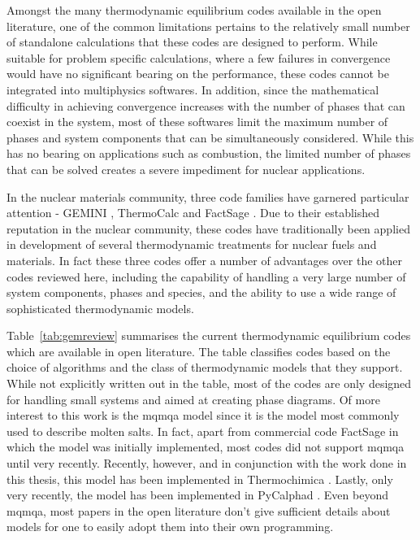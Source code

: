 	Amongst the many thermodynamic equilibrium codes available in the open literature, one of the common limitations pertains to the relatively small number of standalone calculations that these codes are designed to perform. While suitable for problem specific calculations, where a few failures in convergence would have no significant bearing on the performance, these codes cannot be integrated into multiphysics softwares. In addition, since the mathematical difficulty in achieving convergence increases with the number of phases that can coexist in the system, most of these softwares  limit the maximum number of phases and system components that can be simultaneously considered. While this has no bearing on applications such as combustion, the limited number of phases that can be solved creates a severe impediment for nuclear applications.

	In the nuclear materials community, three code families have garnered particular attention - GEMINI \cite{Cheynet09}, ThermoCalc \cite{ANDERSSON2002273} and FactSage \cite{Bale02}. Due to their established reputation in the nuclear community, these codes have traditionally been applied in development of several thermodynamic treatments for nuclear fuels and materials. In fact these three codes offer a number of advantages over the other codes reviewed here, including the capability of handling a very large number of system components, phases and species, and the ability to use a wide range of sophisticated thermodynamic models.

    Table~\ref{tab:gemreview} summarises the current thermodynamic equilibrium codes which are available in open literature. The table classifies codes based on the choice of algorithms and the class of thermodynamic models that they support. While not explicitly written out in the table, most of the codes are only designed for handling small systems and aimed at creating phase diagrams. Of more interest to this work is the \gls{mqmqa} model since it is the model most commonly used to describe molten salts. In fact, apart from commercial code FactSage in which the model was initially implemented, most codes did not support \gls{mqmqa} until very recently. Recently, however, and in conjunction with the work done in this thesis, this model has been implemented in Thermochimica \cite{Poschmann:2021ab}. Lastly, only very recently, the model has been implemented in PyCalphad \cite{Palma:2022aa}. Even beyond \gls{mqmqa}, most papers in the open literature don’t give sufficient details about models for one to easily adopt them into their own programming.
	
